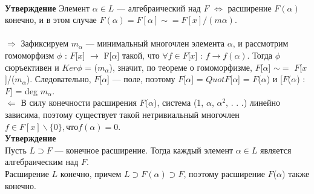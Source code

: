 \ \\ 
\textbf{Утверждение} Элемент $\alpha \in L$ — алгебраический над $F$ $\Longleftrightarrow$ расширение $F(\alpha)$ конечно, и в
этом случае $F(\alpha) = F[\alpha] \sim= F[x]/(m \alpha)$. \\
\Proof \\
$\Rightarrow$ Зафиксируем $m_{\alpha}$ — минимальный многочлен элемента $\alpha$, и рассмотрим гомоморфизм
$\phi$ : $F$[$x$] $\rightarrow$ F[$\alpha$] такой, что $\forall f \in F$[$x$] : $f \rightarrow f(\alpha)$. Тогда $\phi$ сюръективен и $Ker \phi$ = ($m_{\alpha}$),
значит, по теореме о гомоморфизме, $F$[$\alpha$] $\sim =$ $F$[$x$]/($m_{\alpha}$). Следовательно, $F$[$\alpha$] — поле,
поэтому $F$[$\alpha$] = $Quot F$[$\alpha$] = $F$($\alpha$) и [$F$($\alpha$) : $F$] = deg $m_{\alpha}$.\\
$\Leftarrow$ В силу конечности расширения $F$($\alpha$), система (1, $\alpha$, $\alpha^2$, . . .) линейно зависима, поэтому
существует такой нетривиальный многочлен $f \in F[x] \backslash \{0\}, что f(\alpha) = 0.$
\EndProof \\ 
\textbf{Утверждение} \\ 
Пусть $L \supset F$ — конечное расширение. Тогда каждый элемент $\alpha \in L$
является алгебраическим над $F$.
\\
\Proof  Расширение $L$ конечно, причем $L \supset F(\alpha) \supset F$, поэтому расширение $F$($\alpha$) также конечно. \EndProof